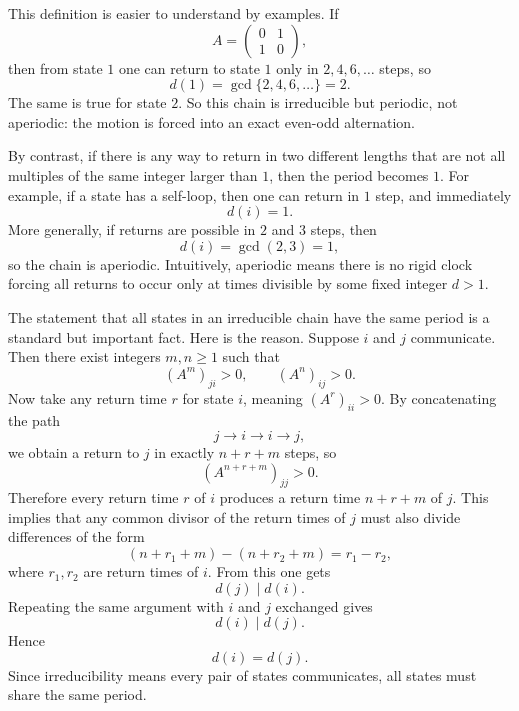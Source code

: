 \documentclass[11pt]{article}
\begin{document}
This definition is easier to understand by examples. If
\begin{equation}
    A=
    \begin{pmatrix}
        0 & 1\\
        1 & 0
    \end{pmatrix},
\end{equation}
then from state \(1\) one can return to state \(1\) only in \(2,4,6,\dots\) steps, so
\begin{equation}
    d(1)=\gcd\{2,4,6,\dots\}=2.
\end{equation}
The same is true for state \(2\). So this chain is irreducible but periodic, not aperiodic:
the motion is forced into an exact even-odd alternation.

By contrast, if there is any way to return in two different lengths that are not all multiples
of the same integer larger than \(1\), then the period becomes \(1\). For example, if a state
has a self-loop, then one can return in \(1\) step, and immediately
\begin{equation}
    d(i)=1.
\end{equation}
More generally, if returns are possible in \(2\) and \(3\) steps, then
\begin{equation}
    d(i)=\gcd(2,3)=1,
\end{equation}
so the chain is aperiodic. Intuitively, aperiodic means there is no rigid clock forcing all
returns to occur only at times divisible by some fixed integer \(d>1\).

The statement that all states in an irreducible chain have the same period is a standard but
important fact. Here is the reason. Suppose \(i\) and \(j\) communicate. Then there exist
integers \(m,n\ge 1\) such that
\begin{equation}
    (A^m)_{ji}>0,
    \qquad
    (A^n)_{ij}>0.
\end{equation}
Now take any return time \(r\) for state \(i\), meaning \((A^r)_{ii}>0\). By concatenating the
path
\begin{equation}
    j \to i \to i \to j,
\end{equation}
we obtain a return to \(j\) in exactly \(n+r+m\) steps, so
\begin{equation}
    (A^{n+r+m})_{jj}>0.
\end{equation}
Therefore every return time \(r\) of \(i\) produces a return time \(n+r+m\) of \(j\). This
implies that any common divisor of the return times of \(j\) must also divide differences of
the form
\begin{equation}
    (n+r_1+m)-(n+r_2+m)=r_1-r_2,
\end{equation}
where \(r_1,r_2\) are return times of \(i\). From this one gets
\begin{equation}
    d(j)\mid d(i).
\end{equation}
Repeating the same argument with \(i\) and \(j\) exchanged gives
\begin{equation}
    d(i)\mid d(j).
\end{equation}
Hence
\begin{equation}
    d(i)=d(j).
\end{equation}
Since irreducibility means every pair of states communicates, all states must share the same
period.
\end{document}
